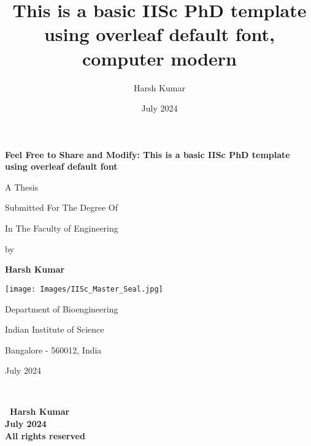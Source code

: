\documentclass[12pt,twoside,a4paper]{report}
\title {This is a basic IISc PhD template using overleaf default font, computer modern}
\author{Harsh Kumar}
\date{July 2024}
\newcommand{\thesistitle}{Feel Free to Share and Modify: This is a basic IISc PhD template using overleaf default font}
\newcommand{\myname}{Harsh Kumar}
\newcommand{\thesisdate}{July 2024}
\begin{document}
\begin{titlepage}
    \centering
     {\huge \textbf{\thesistitle} \par}
      \vspace{2cm}
     {\large \sc A Thesis \par}
      \vspace{0.2cm}
     {\large \sc Submitted For The Degree Of \par}
     \vspace{0.2cm}
      {\large {} \par} 
     \vspace{0.2cm}
     {\large \sc In The Faculty of Engineering  \par}
     
     \vspace{1cm}
     {\large  by \par}
     \vspace{0.5cm}
     {\large \textbf{\myname} \par}
     \vspace{2cm}
    \texttt{[image: Images/IISc\_Master\_Seal.jpg]}\par
    \vspace{1cm}
    {\large \sc Department of Bioengineering \par}

     {\large \sc Indian Institute of Science  \par}

     {\large \sc Bangalore - 560012, India \par}
    \vspace{0.5cm}
    {\large \sc \thesisdate \par}
    \vspace{2cm}
   
\end{titlepage}



\clearpage
\thispagestyle{empty}
\


\clearpage
\thispagestyle{empty}
\begin{center}
    \vspace*{\fill}
   \textbf{\textcopyright \ \myname \\ [5pt]
                                \thesisdate\\ [5pt]
                            All rights reserved\\
                            }
    \vspace*{\fill}
\end{center}
\clearpage
\end{document}
